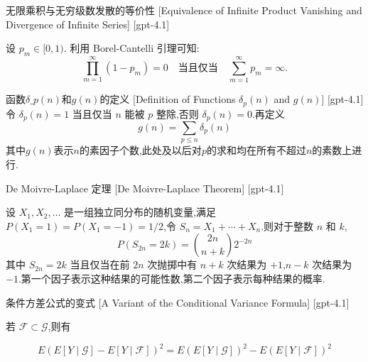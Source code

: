 \documentclass[UTF8]{ctexart}
\begin{document}
    
    
    \begin{thm}
        {无限乘积与无穷级数发散的等价性}
        [Equivalence of Infinite Product Vanishing and Divergence of Infinite Series]
        [gpt-4.1]
        
设 $p_{m} \in [0, 1)$. 利用 Borel-Cantelli 引理可知:
\[
\prod_{m=1}^{\infty} (1 - p_{m}) = 0 \quad \mathrm{当且仅当} \quad \sum_{m=1}^{\infty} p_{m} = \infty.
\]

    \end{thm}
    
    
    
    \begin{dfn}
        {函数$\delta\_p(n)$和$g(n)$的定义}
        [Definition of Functions $\delta_p(n)$ and $g(n)$]
        [gpt-4.1]
        令 $\delta_p(n) = 1$ 当且仅当 $n$ 能被 $p$ 整除,否则 $\delta_p(n) = 0$.再定义
\[
g(n) = \sum_{p \leq n} \delta_p(n)
\]
其中$g(n)$表示$n$的素因子个数,此处及以后对$p$的求和均在所有不超过$n$的素数上进行.
    \end{dfn}
    
    
    
    \begin{thm}
        {De Moivre-Laplace 定理}
        [De Moivre-Laplace Theorem]
        [gpt-4.1]
        
设 $X_{1}, X_{2}, \dots$ 是一组独立同分布的随机变量,满足 $P(X_{1}=1) = P(X_{1} = -1) = 1/2$,令 $S_{n} = X_{1} + \cdots + X_{n}$.则对于整数 $n$ 和 $k$,
\[
P(S_{2n} = 2k) = \binom{2n}{n+k} 2^{-2n}
\]
其中 $S_{2n} = 2k$ 当且仅当在前 $2n$ 次抛掷中有 $n + k$ 次结果为 $+1$,$n - k$ 次结果为 $-1$.第一个因子表示这种结果的可能性数,第二个因子表示每种结果的概率.

    \end{thm}
    
    
    
    \begin{thm}
        {条件方差公式的变式}
        [A Variant of the Conditional Variance Formula]
        [gpt-4.1]
        
若 $\mathcal{F} \subset \mathcal{G}$,则有

\[
E\left( E[ Y \mid \mathcal{G} ] - E[ Y \mid \mathcal{F} ] \right)^{2} = E \left( E[ Y \mid \mathcal{G} ] \right)^{2} - E \left( E[ Y \mid \mathcal{F} ] \right)^{2}
\]

    \end{thm}
    
\end{document}
